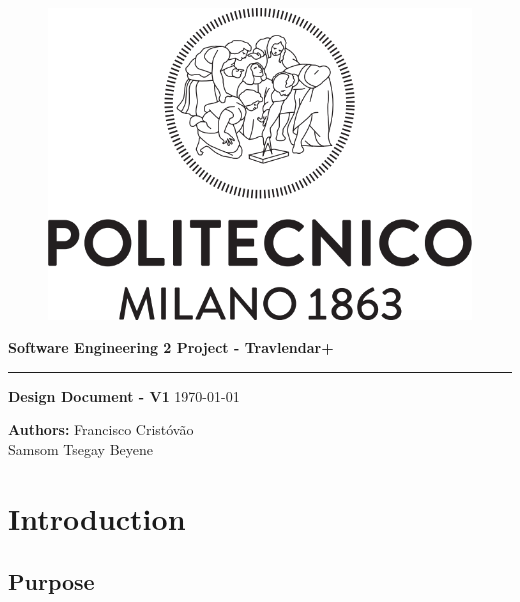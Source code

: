 \documentclass[12pt]{article}
\begin{document}
\begin{titlepage}
    \begin{center}
    \begin{figure}
        \centering
        \includegraphics[scale=0.2]{logoPolimi.png}
        \vspace{1.5cm}
    \end{figure}

    \Huge\textbf{Software Engineering 2 Project - Travlendar+}
    \rule{12cm}{0.5pt}
    \Huge\textbf{Design Document - V1}
    \today
    \end{center}
    
    \vspace{3cm}
    
    \begin{flushleft}
        \LARGE\textbf{Authors: }
        \newline\newline
        \Large\texttt{}{Francisco Cristóvão \\ Samsom Tsegay Beyene}
    \end{flushleft}



\end{titlepage}

\newpage
  \tableofcontents
\newpage

\section{Introduction}

\subsection{Purpose}
\end{document}
